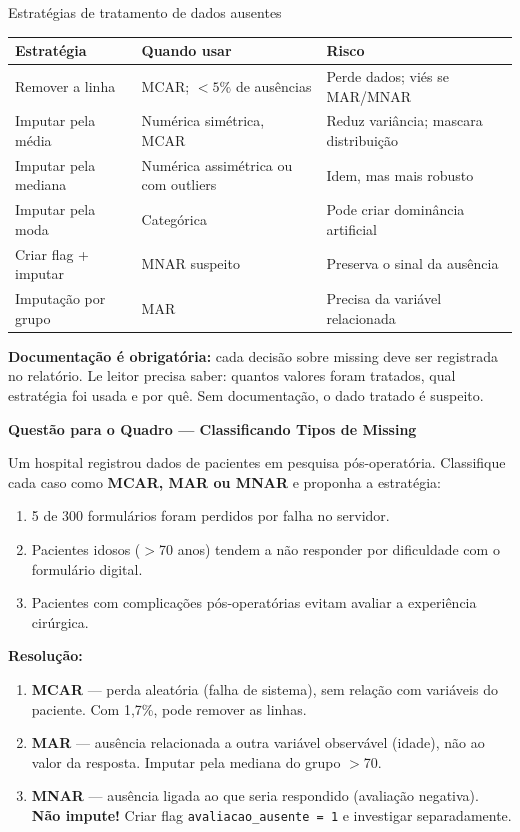 \begin{FormulaBox}{Estratégias de tratamento de dados ausentes}
\begin{tabular}{|l|p{5cm}|p{5cm}|}
\hline
\textbf{Estratégia} & \textbf{Quando usar} & \textbf{Risco} \\
\hline
Remover a linha & MCAR; $<\!5\%$ de ausências & Perde dados; viés se MAR/MNAR \\
Imputar pela média & Numérica simétrica, MCAR & Reduz variância; mascara distribuição \\
Imputar pela mediana & Numérica assimétrica ou com outliers & Idem, mas mais robusto \\
Imputar pela moda & Categórica & Pode criar dominância artificial \\
Criar flag + imputar & MNAR suspeito & Preserva o sinal da ausência \\
Imputação por grupo & MAR & Precisa da variável relacionada \\
\hline
\end{tabular}
\end{FormulaBox}

\begin{NoteBox}
\textbf{Documentação é obrigatória:} cada decisão sobre missing deve ser
registrada no relatório. Le leitor precisa saber: quantos valores foram
tratados, qual estratégia foi usada e por quê. Sem documentação, o dado
tratado é suspeito.
\end{NoteBox}

\begin{SolvedBox}
\textbf{Questão para o Quadro — Classificando Tipos de Missing}

Um hospital registrou dados de pacientes em pesquisa pós-operatória.
Classifique cada caso como \textbf{MCAR, MAR ou MNAR} e proponha a estratégia:

\begin{enumerate}[label=\alph*)]
  \item 5 de 300 formulários foram perdidos por falha no servidor.
  \item Pacientes idosos ($>$70 anos) tendem a não responder por
  dificuldade com o formulário digital.
  \item Pacientes com complicações pós-operatórias evitam avaliar a
  experiência cirúrgica.
\end{enumerate}

\textbf{Resolução:}
\begin{enumerate}[label=\alph*)]
  \item \textbf{MCAR} — perda aleatória (falha de sistema), sem relação com
  variáveis do paciente. Com 1,7\%, pode remover as linhas.
  \item \textbf{MAR} — ausência relacionada a outra variável observável
  (idade), não ao valor da resposta. Imputar pela mediana do grupo $>$70.
  \item \textbf{MNAR} — ausência ligada ao que seria respondido (avaliação
  negativa). \textbf{Não impute!} Criar flag \texttt{avaliacao\_ausente = 1}
  e investigar separadamente.
\end{enumerate}
\end{SolvedBox}


